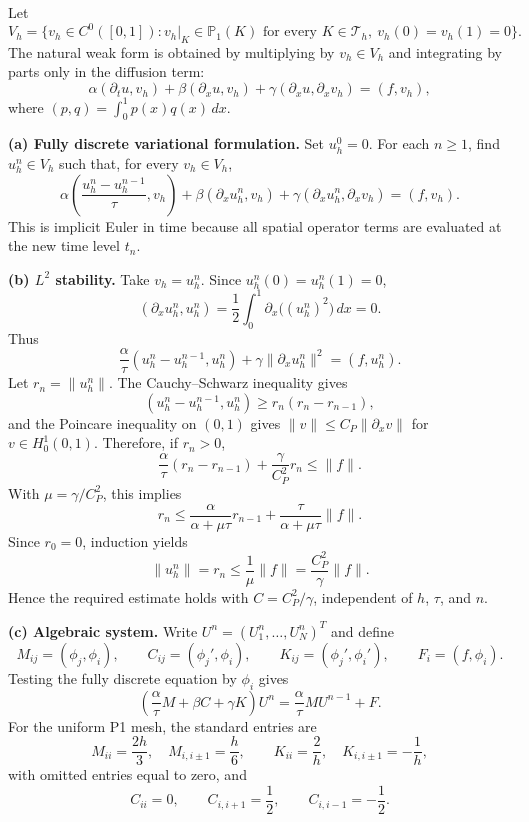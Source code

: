 \begin{solution}
Let
\[
V_h=\{v_h\in C^0([0,1]): v_h|_K\in \mathbb{P}_1(K)\text{ for every }K\in\mathcal{T}_h,
\ v_h(0)=v_h(1)=0\}.
\]
The natural weak form is obtained by multiplying by $v_h\in V_h$ and integrating by parts
only in the diffusion term:
\[
\alpha(\partial_t u,v_h)+\beta(\partial_x u,v_h)+\gamma(\partial_x u,\partial_x v_h)
=(f,v_h),
\]
where $(p,q)=\int_0^1 p(x)q(x)\,dx$.

\textbf{(a) Fully discrete variational formulation.}
Set $u_h^0=0$. For each $n\geq 1$, find $u_h^n\in V_h$ such that, for every $v_h\in V_h$,
\[
\alpha\left(\frac{u_h^n-u_h^{n-1}}{\tau},v_h\right)
+\beta(\partial_x u_h^n,v_h)
+\gamma(\partial_x u_h^n,\partial_x v_h)
=(f,v_h).
\]
This is implicit Euler in time because all spatial operator terms are evaluated at the new
time level $t_n$.

\textbf{(b) $L^2$ stability.}
Take $v_h=u_h^n$. Since $u_h^n(0)=u_h^n(1)=0$,
\[
(\partial_x u_h^n,u_h^n)
=\frac{1}{2}\int_0^1 \partial_x\bigl((u_h^n)^2\bigr)\,dx
=0.
\]
Thus
\[
\frac{\alpha}{\tau}(u_h^n-u_h^{n-1},u_h^n)+\gamma\|\partial_x u_h^n\|^2=(f,u_h^n).
\]
Let $r_n=\|u_h^n\|$. The Cauchy--Schwarz inequality gives
\[
(u_h^n-u_h^{n-1},u_h^n)\geq r_n(r_n-r_{n-1}),
\]
and the Poincare inequality on $(0,1)$ gives $\|v\|\leq C_P\|\partial_x v\|$ for
$v\in H_0^1(0,1)$. Therefore, if $r_n>0$,
\[
\frac{\alpha}{\tau}(r_n-r_{n-1})+\frac{\gamma}{C_P^2}r_n\leq \|f\|.
\]
With $\mu=\gamma/C_P^2$, this implies
\[
r_n\leq \frac{\alpha}{\alpha+\mu\tau}r_{n-1}
+\frac{\tau}{\alpha+\mu\tau}\|f\|.
\]
Since $r_0=0$, induction yields
\[
\|u_h^n\|=r_n\leq \frac{1}{\mu}\|f\|
=\frac{C_P^2}{\gamma}\|f\|.
\]
Hence the required estimate holds with $C=C_P^2/\gamma$, independent of $h$, $\tau$, and
$n$.

\textbf{(c) Algebraic system.}
Write $U^n=(U_1^n,\ldots,U_N^n)^T$ and define
\[
M_{ij}=(\phi_j,\phi_i),\qquad
C_{ij}=(\phi_j',\phi_i),\qquad
K_{ij}=(\phi_j',\phi_i'),\qquad
F_i=(f,\phi_i).
\]
Testing the fully discrete equation by $\phi_i$ gives
\[
\left(\frac{\alpha}{\tau}M+\beta C+\gamma K\right)U^n
=\frac{\alpha}{\tau}M U^{n-1}+F.
\]
For the uniform P1 mesh, the standard entries are
\[
M_{ii}=\frac{2h}{3},\quad M_{i,i\pm 1}=\frac{h}{6},\qquad
K_{ii}=\frac{2}{h},\quad K_{i,i\pm 1}=-\frac{1}{h},
\]
with omitted entries equal to zero, and
\[
C_{ii}=0,\qquad C_{i,i+1}=\frac{1}{2},\qquad C_{i,i-1}=-\frac{1}{2}.
\]
\end{solution}

